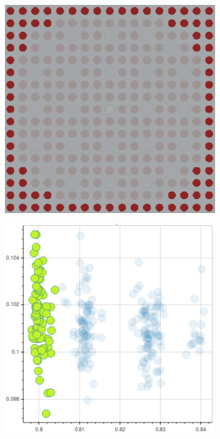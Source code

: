 \begin{figure}[h!]
\begin{subfigure}{0.45\textwidth}
  \caption{}
  \label{fig:chap10-capt-mean-std-mgxs}
\end{subfigure}
\begin{subfigure}{0.45\textwidth}
  \centering
  \includegraphics[width=0.9\linewidth]{figures/unsupervised/features/assm-16/u238-capt/mean-std/geometry-2}
  \caption{}
  \label{fig:chap10-capt-mean-std-geom-2}
\end{subfigure}%
\begin{subfigure}{0.45\textwidth}
  \centering
  \includegraphics[width=0.9\linewidth]{figures/unsupervised/features/assm-16/u238-capt/mean-std/mgxs-2}

\end{subfigure}
\end{figure}
